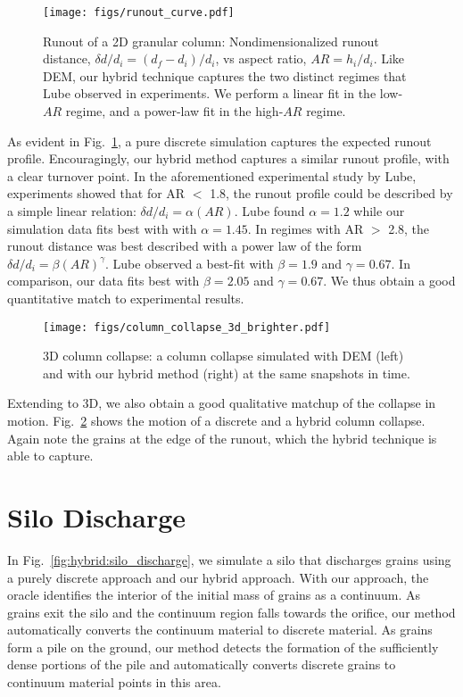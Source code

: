 \begin{figure}
  \centering
  \texttt{[image: figs/runout\_curve.pdf]}
  \caption{
    Runout of a 2D granular column: Nondimensionalized runout distance, $\delta d/d_i=(d_f-d_i) / d_i$, vs aspect ratio, $AR = h_i / d_i$. Like DEM, our hybrid technique captures the two distinct regimes that Lube \cite{Lube:2005} observed in experiments. We perform a linear fit in the low-$AR$ regime, and a power-law fit in the high-$AR$ regime.}
  \label{fig:hybrid:runout_curve}
\end{figure}

As evident in Fig.~\ref{fig:hybrid:runout_curve}, a pure discrete simulation captures the expected runout profile. Encouragingly, our hybrid method
captures a similar runout profile, with a clear turnover point. In the aforementioned experimental study by Lube, experiments showed that for AR $<$ 1.8, the runout profile could be described
by a simple linear relation:  $\delta d/d_i=\alpha(AR)$. Lube found $\alpha = 1.2$ while our simulation data fits best with with $\alpha = 1.45$. 
In regimes with AR $>$ 2.8, the runout distance was best described with a power law of the form  $\delta d/d_i=\beta(AR)^\gamma$. Lube observed a best-fit with $\beta = 1.9$ and $\gamma = 0.67$. In comparison, our data fits best with $\beta = 2.05$ and $\gamma = 0.67$. We thus obtain a good quantitative match to experimental results.

\begin{figure}
  \centering
  \texttt{[image: figs/column\_collapse\_3d\_brighter.pdf]}
  \caption{
    3D column collapse: a column collapse simulated with DEM (left) and with our hybrid method (right) at the same snapshots in time.
  }
  \label{fig:hybrid:column_collapse_3d}
\end{figure}

Extending to 3D, we also obtain a good qualitative matchup of the collapse in motion. Fig.~\ref{fig:hybrid:column_collapse_3d} shows the motion of a discrete and a hybrid column collapse.
Again note the grains at the edge of the runout, which the hybrid technique is able to capture.

\section{Silo Discharge}
In Fig.~\ref{fig:hybrid:silo_discharge}, we simulate a silo that discharges grains using a purely discrete approach and our hybrid approach.
With our approach, the oracle identifies the interior of the
initial mass of grains as a continuum. As grains exit the silo and the continuum region falls towards the orifice, our
method automatically converts the continuum material to discrete material. As grains form a pile on the ground, our
method detects the formation of the sufficiently dense portions of the pile and automatically converts discrete grains
to continuum material points in this area.

